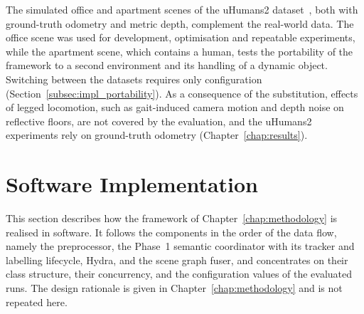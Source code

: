 {\small The simulated office and apartment scenes of the uHumans2 dataset~\cite{rosinol2021kimera}, both with ground-truth odometry and metric depth, complement the real-world data. The office scene was used for development, optimisation and repeatable experiments, while the apartment scene, which contains a human, tests the portability of the framework to a second environment and its handling of a dynamic object. Switching between the datasets requires only configuration (Section~\ref{subsec:impl_portability}). As a consequence of the substitution, effects of legged locomotion, such as gait-induced camera motion and depth noise on reflective floors, are not covered by the evaluation, and the uHumans2 experiments rely on ground-truth odometry (Chapter~\ref{chap:results}).\par}

























\section{Software Implementation}
\label{sec:impl_software}

{\small This section describes how the framework of Chapter~\ref{chap:methodology} is realised in software. It follows the components in the order of the data flow, namely the preprocessor, the Phase~1 semantic coordinator with its tracker and labelling lifecycle, Hydra, and the scene graph fuser, and concentrates on their class structure, their concurrency, and the configuration values of the evaluated runs. The design rationale is given in Chapter~\ref{chap:methodology} and is not repeated here.\par}

